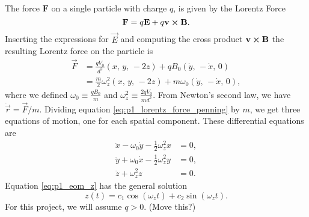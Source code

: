 The force $\mathbf{F}$ on a single particle with charge $q$, is given by the Lorentz Force 
\begin{equation}
    \mathbf{F} = q \mathbf{E} + q \mathbf{v} \cross \mathbf{B}. \label{eq:em_force}
\end{equation}
Inserting the expressions for $\vec{E}$ and computing the cross product $\mathbf{v}\cross \mathbf{B}$ the resulting Lorentz force on the particle is 
\begin{equation} \label{eq:p1_lorentz_force_penning}
    \begin{split}
        \vec{F} &= \frac{q V_0}{d^2}(x,\,y,\,-2z) + q B_0 (\dot{y},\,-\dot{x},\,0) \\
        &= \frac{m}{2}\omega_z^2 (x,\,y,\,-2z) + m \omega_0 (\dot{y},\,-\dot{x},\,0),
    \end{split}
\end{equation} 
where we defined $\omega_0\equiv \frac{qB_0}{m}$ and $\omega_z^2 \equiv \frac{2qV_0}{m d^2}$. From Newton's second law, we have $\ddot{\vec{r}}=\vec{F}/m$. Dividing equation \eqref{eq:p1_lorentz_force_penning} by $m$, we get three equations of motion, one for each spatial component. These differential equations are 
\begin{align}
    \ddot{x} - \omega_0 \dot{y} - \frac{1}{2} \omega_z^2 x &= 0, \label{eq:p1_eom_x} \\ 
    \ddot{y} + \omega_0 \dot{x} - \frac{1}{2} \omega_z^2 y &= 0, \label{eq:p1_eom_y} \\ 
    \ddot{z} + \omega_z^2 z &= 0. \label{eq:p1_eom_z}
\end{align}
Equation \eqref{eq:p1_eom_z} has the general solution   
\begin{equation}
    z(t) = c_1 \cos(\omega_z t) + c_2 \sin(\omega_z t). \label{eq:p1_diffeq_solution_z}
\end{equation}
For this project, we will assume $q>0$. (Move this?)

